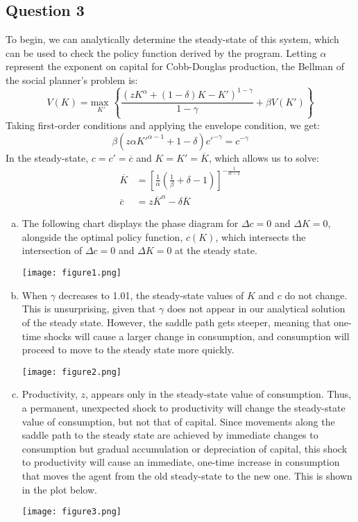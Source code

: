 \documentclass{article}
\newcommand{\usmax}[1]{\underset{#1}{\text{max }}}
\begin{document}
\subsection*{Question 3}
To begin, we can analytically determine the steady-state of this system, which can be used to check the policy function derived by the program. Letting $\alpha$ represent the exponent on capital for Cobb-Douglas production, the Bellman of the social planner's problem is:
\[
	V(K) = \usmax{K'}\left\{\frac{\left(zK^\alpha + (1-\delta)K -K'\right)^{1-\gamma}}{1-\gamma} + \beta V(K')\right\}
\]
Taking first-order conditions and applying the envelope condition, we get:
\[
	\beta\left(z\alpha K'^{\alpha-1}+1-\delta\right)c'^{-\gamma} = c^{-\gamma}
\]
In the steady-state, $c=c'=\overline{c}$ and $K=K'=\overline{K}$, which allows us to solve:
\begin{align*}
	\overline{K} &= \left[\frac{1}{\alpha}\left(\frac{1}{\beta} + \delta - 1\right)\right]^{-\frac{1}{\alpha-1}}	\\
	\overline{c} &= z\overline{K}^\alpha - \delta\overline{K}
\end{align*}

\begin{enumerate}[(a)]
	\item The following chart displays the phase diagram for ${\Delta c=0}$ and ${\Delta K=0}$, alongside the optimal policy function, $c(K)$, which intersects the intersection of ${\Delta c=0}$ and ${\Delta K=0}$ at the steady state.
		\begin{center}
			\texttt{[image: figure1.png]}
		\end{center}
	
	\item When $\gamma$ decreases to 1.01, the steady-state values of $K$ and $c$ do not change. This is unsurprising, given that $\gamma$ does not appear in our analytical solution of the steady state. However, the saddle path gets steeper, meaning that one-time shocks will cause a larger change in consumption, and consumption will proceed to move to the steady state more quickly.
		\begin{center}
			\texttt{[image: figure2.png]}
		\end{center}
	
	\item Productivity, $z$, appears only in the steady-state value of consumption. Thus, a permanent, unexpected shock to productivity will change the steady-state value of consumption, but not that of capital. Since movements along the saddle path to the steady state are achieved by immediate changes to consumption but gradual accumulation or depreciation of capital, this shock to productivity will cause an immediate, one-time increase in consumption that moves the agent from the old steady-state to the new one. This is shown in the plot below.
		\begin{center}
			\texttt{[image: figure3.png]}
		\end{center}
	
\end{enumerate}

\end{document}
